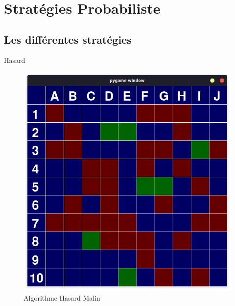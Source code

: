 \section{Stratégies Probabiliste}

\subsection{Les différentes stratégies}
	
	\begin{frame}{Hasard}
		\begin{figure}
		    \centering
		    \includegraphics[width=.5\linewidth]{images/algoHasardMalin.png}
		    \caption*{Algorithme Hasard Malin}
		    \label{fig:algoHasardMalin}
		\end{figure}{}
	\end{frame}
	

